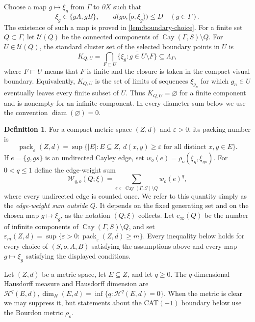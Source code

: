 \documentclass[11pt]{article}
\theoremstyle{definition}
\newtheorem*{definition*}{Definition}
\newcommand{\diam}{\operatorname{diam}}
\newcommand{\pack}{\operatorname{pack}}
\newcommand{\EdgeSum}{\mathcal W}
\newcommand{\Cay}{\operatorname{Cay}}
\begin{document}
Choose a map $g\mapsto\xi_g$ from $\Gamma$ to $\partial X$ such
that
\[
 \xi_g\in\{gA,gB\},\qquad d\bigl(go,[o,\xi_g)\bigr)\le D
 \quad(g\in\Gamma).
\]
The existence of such a map is proved in \cref{lem:boundary-choice}.  For a finite set $Q\subset\Gamma$, let
$\mathscr U(Q)$ be the connected components of $\Cay(\Gamma,S)\setminus Q$.  For
$U\in\mathscr U(Q)$, the standard cluster set of the selected boundary points in $U$ is
\begin{equation}\label{eq:intro-general-cluster}
 K_{Q,U}=\bigcap_{F\sqsubset U}\overline{\{\xi_g:g\in U\setminus F\}}
 \subseteq\Lambda_\Gamma,
\end{equation}
where $F\sqsubset U$ means that $F$ is finite and the closure is taken in the compact visual
boundary.  Equivalently, $K_{Q,U}$ is the set of limits of sequences $\xi_{g_n}$ for which
$g_n\in U$ eventually leaves every finite subset of $U$.  Thus $K_{Q,U}=\varnothing$ for a
finite component and is nonempty for an infinite component.  In every diameter sum below we
use the convention $\diam(\varnothing)=0$.
\begin{definition*}
For a compact metric space $(Z,d)$ and $\varepsilon>0$, its packing number is
\[
 \pack_\varepsilon(Z,d)=
 \sup\bigl\{|E|:E\subseteq Z,\ d(x,y)\ge\varepsilon
 \text{ for all distinct }x,y\in E\bigr\}.
\]
If $e=\{g,gs\}$ is an undirected Cayley edge, set
$w_o(e)=\rho_o(\xi_g,\xi_{gs})$.  For $0<q\le1$ define the edge-weight sum
\begin{equation}\label{eq:intro-boundary-edge-sum}
 \EdgeSum_{q,o}(Q;\xi)=
 \sum_{e\subset \Cay(\Gamma,S)\setminus Q}w_o(e)^q,
\end{equation}
where every undirected edge is counted once.  We refer to this quantity simply as the
\emph{edge-weight sum outside $Q$}.  It depends on the fixed generating set and on the
chosen map $g\mapsto\xi_g$, as the notation $(Q;\xi)$ collects.  Let $c_\infty(Q)$ be the number
of infinite components of $\Cay(\Gamma,S)\setminus Q$, and set 
$\varepsilon_m(Z,d)=\sup\{\varepsilon>0:\pack_\varepsilon(Z,d)\ge m\}$.  Every inequality below holds for every choice of $(S,o,A,B)$ satisfying the assumptions above and every map $g\mapsto\xi_g$ satisfying the displayed conditions.
\end{definition*}

Let $(Z,d)$ be a metric space, let $E\subseteq Z$, and let $q\ge0$.  
The $q$-dimensional Hausdorff measure and Hausdorff dimension are
$
 \mathcal H^q(E,d),
 \dim_H(E,d)=\inf\{q:\mathcal H^q(E,d)=0\}.
$
When the metric is clear we may suppress it, but statements
about the CAT$(-1)$ boundary below use the Bourdon metric $\rho_o.$
\end{document}
